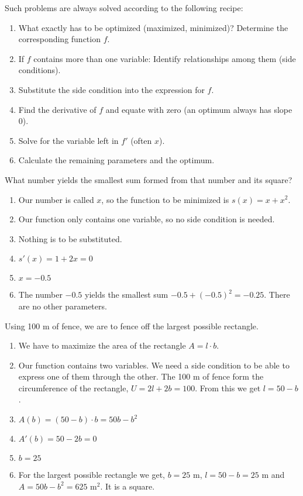 \documentclass[12pt,eng]{skript_ogg}
\begin{document}
Such problems are always solved according to the following recipe:
\begin{enumerate}
\setlength{\itemsep}{-0.5ex}
\item What exactly has to be optimized (maximized, minimized)? Determine the corresponding function $f$.
\item If $f$ contains more than one variable: Identify relationships among them (side conditions).
\item Substitute the side condition into the expression for $f$.
\item Find the derivative of $f$ and equate with zero (an optimum always has slope 0).
\item Solve for the variable left in $f'$ (often $x$).
\item Calculate the remaining parameters and the optimum.
\end{enumerate}

\begin{beispiel}
What number yields the smallest sum formed from that number and its square?
\begin{enumerate}
\setlength{\itemsep}{-0.5ex}
\item Our number is called $x$, so the function to be minimized is $s(x)=x+x^2$.
\item Our function only contains one variable, so no side condition is needed.
\item Nothing is to be substituted.
\item $s'(x)=1+2x=0$
\item $x=-0.5$
\item The number $-0.5$ yields the smallest sum $-0.5+(-0.5)^2=-0.25$. There are no other parameters.
\end{enumerate}
\end{beispiel}

\begin{beispiel}
Using 100 m of fence, we are to fence off the largest possible rectangle.
\begin{enumerate}
\setlength{\itemsep}{-0.5ex}
\item We have to maximize the area of the rectangle $A=l\cdot b$.
\item Our function contains two variables. We need a side condition to be able to express one of them through the other. The 100 m of fence form the circumference of the rectangle, $U=2l+2b=100$. From this we get $l=50-b$.
\item $A(b)=(50-b)\cdot b=50b-b^2$
\item $A'(b)=50-2b=0$
\item $b=25$
\item For the largest possible rectangle we get, $b=25$ m, $l=50-b=25$ m and $A=50b-b^2=625$ m$^2$. It is a square.
\end{enumerate}
\end{beispiel}
\end{document}
